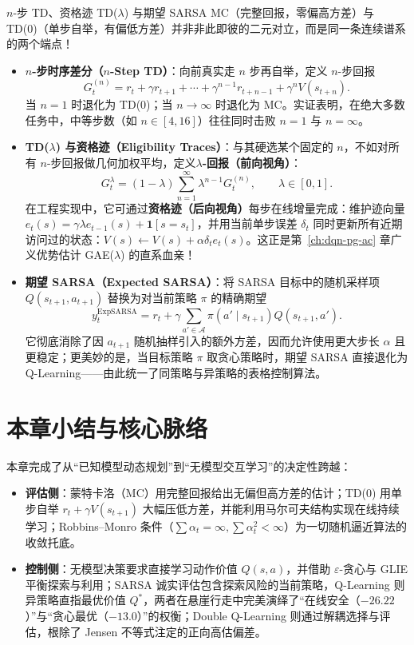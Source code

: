 \begin{extBox}{$n$-步 TD、资格迹 TD($\lambda$) 与期望 SARSA}
MC（完整回报，零偏高方差）与 TD(0)（单步自举，有偏低方差）并非非此即彼的二元对立，而是同一条连续谱系的两个端点！
\begin{itemize}
  \item \textbf{$n$-步时序差分（$n$-Step TD）}：向前真实走 $n$ 步再自举，定义 $n$-步回报
  \[
    G_t^{(n)} = r_t + \gamma r_{t+1} + \cdots + \gamma^{n-1} r_{t+n-1} + \gamma^n V(s_{t+n}).
  \]
  当 $n=1$ 时退化为 TD(0)；当 $n \to \infty$ 时退化为 MC。实证表明，在绝大多数任务中，中等步数（如 $n \in [4, 16]$）往往同时击败 $n=1$ 与 $n=\infty$。
  \item \textbf{TD($\lambda$) 与资格迹（Eligibility Traces）}：与其硬选某个固定的 $n$，不如对所有 $n$-步回报做几何加权平均，定义\textbf{$\lambda$-回报（前向视角）}：
  \[
    G_t^\lambda = (1 - \lambda) \sum_{n=1}^{\infty} \lambda^{n-1} G_t^{(n)}, \qquad \lambda \in [0, 1].
  \]
  在工程实现中，它可通过\textbf{资格迹（后向视角）}每步在线增量完成：维护迹向量 $e_t(s) = \gamma \lambda e_{t-1}(s) + \mathbf{1}[s = s_t]$，并用当前单步误差 $\delta_t$ 同时更新所有近期访问过的状态：$V(s) \leftarrow V(s) + \alpha \delta_t e_t(s)$。这正是第~\ref{ch:dqn-pg-ac} 章广义优势估计 GAE($\lambda$) 的直系血亲！
  \item \textbf{期望 SARSA（Expected SARSA）}：将 SARSA 目标中的随机采样项 $Q(s_{t+1}, a_{t+1})$ 替换为对当前策略 $\pi$ 的精确期望
  \[
    y_t^{\mathrm{ExpSARSA}} = r_t + \gamma \sum_{a' \in \mathcal{A}} \pi(a' \mid s_{t+1}) Q(s_{t+1}, a').
  \]
  它彻底消除了因 $a_{t+1}$ 随机抽样引入的额外方差，因而允许使用更大步长 $\alpha$ 且更稳定；更美妙的是，当目标策略 $\pi$ 取贪心策略时，期望 SARSA 直接退化为 Q-Learning——由此统一了同策略与异策略的表格控制算法。
\end{itemize}
\end{extBox}

\section*{本章小结与核心脉络}

本章完成了从“已知模型动态规划”到“无模型交互学习”的决定性跨越：
\begin{itemize}
  \item \textbf{评估侧}：蒙特卡洛（MC）用完整回报给出无偏但高方差的估计；TD(0) 用单步自举 $r_t + \gamma V(s_{t+1})$ 大幅压低方差，并能利用马尔可夫结构实现在线持续学习；Robbins--Monro 条件（$\sum \alpha_t = \infty, \sum \alpha_t^2 < \infty$）为一切随机逼近算法的收敛托底。
  \item \textbf{控制侧}：无模型决策要求直接学习动作价值 $Q(s, a)$，并借助 $\varepsilon$-贪心与 GLIE 平衡探索与利用；SARSA 诚实评估包含探索风险的当前策略，Q-Learning 则异策略直指最优价值 $Q^*$，两者在悬崖行走中完美演绎了“在线安全（$-26.22$）”与“贪心最优（$-13.0$）”的权衡；Double Q-Learning 则通过解耦选择与评估，根除了 Jensen 不等式注定的正向高估偏差。
\end{itemize}

